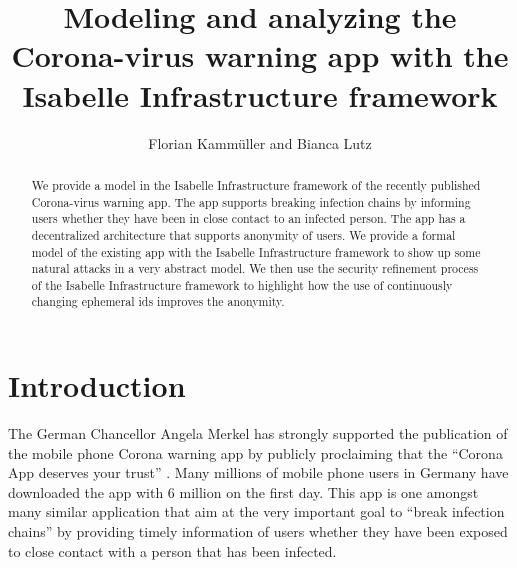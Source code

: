\documentclass{llncs}
\begin{document}
\frontmatter
  
\mainmatter
\title{Modeling and analyzing the Corona-virus warning app with the Isabelle Infrastructure framework}
\author{Florian Kamm\"uller and Bianca Lutz}

\maketitle
\begin{abstract}
We provide a model in the Isabelle Infrastructure framework of the recently published
Corona-virus warning app. The app supports breaking infection chains by informing users
whether they have been in close contact to an infected person. The app has a decentralized
architecture that supports anonymity of users.
We provide a formal model of the existing app with the Isabelle Infrastructure framework
to show up some natural attacks in a very abstract model. We then use the security
refinement process of the Isabelle Infrastructure framework to highlight how the use of
continuously changing ephemeral ids improves the anonymity.
\end{abstract}

\section{Introduction}
\label{sec:intro}
The German Chancellor Angela Merkel has strongly supported the publication of
the mobile phone Corona warning app by publicly proclaiming that the ``Corona
App deserves your trust'' \cite{bundes:20}. Many millions of mobile phone users
in Germany have downloaded the app with 6 million on the first day.
This app is one amongst many similar application that aim at the very important goal
to ``break infection chains'' by providing timely information of users whether they
have been exposed to close contact with a person that has been infected.
\end{document}
